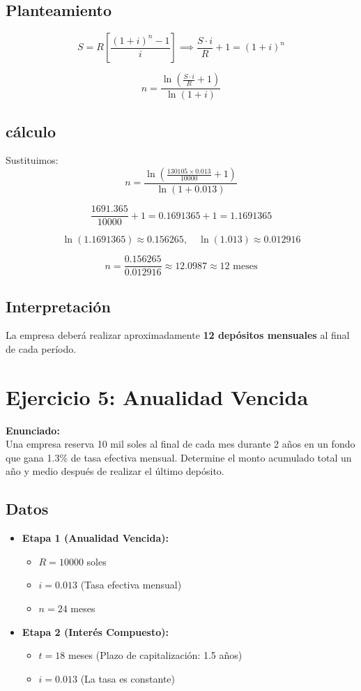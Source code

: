 \documentclass[12pt,a4paper]{article}
\begin{document}
	\subsection*{Planteamiento }

	$$S = R \left[ \frac{(1 + i)^n - 1}{i} \right] \implies \frac{S \cdot i}{R} + 1 = (1 + i)^n$$
	
	$$n = \frac{\ln\left(\frac{S \cdot i}{R} + 1\right)}{\ln(1 + i)}$$
	
	\subsection*{cálculo }
	Sustituimos:
	$$n = \frac{\ln\left(\frac{130105 \times 0.013}{10000} + 1\right)}{\ln(1 + 0.013)}$$
	
	$$\frac{1691.365}{10000} + 1 = 0.1691365 + 1 = 1.1691365$$

	$$\ln(1.1691365) \approx 0.156265, \quad \ln(1.013) \approx 0.012916$$
	
	$$n = \frac{0.156265}{0.012916} \approx 12.0987 \approx 12 \text{ meses}$$
	
	\subsection*{Interpretación}
	La empresa deberá realizar aproximadamente \textbf{12 depósitos mensuales}  al final de cada período.
	
\newpage
	\section*{Ejercicio 5: Anualidad Vencida}
	
	\textbf{Enunciado:} \\
	Una empresa reserva 10 mil soles al final de cada mes durante 2 años en un fondo que gana 1.3\% de tasa efectiva mensual. Determine el monto acumulado total un año y medio después de realizar el último depósito.
	
	\subsection*{Datos}
	
	\begin{itemize}
		\item \textbf{Etapa 1 (Anualidad Vencida):} 
		\begin{itemize}
			\item $R = 10000$ soles 
			\item $i = 0.013$ (Tasa efectiva mensual)
			\item $n = 24$ meses
		\end{itemize}
		\item \textbf{Etapa 2 (Interés Compuesto):} 
		\begin{itemize}
			\item $t = 18$ meses (Plazo de capitalización: 1.5 años)
			\item $i = 0.013$ (La tasa es constante)
		\end{itemize}
	\end{itemize}
	
\end{document}
